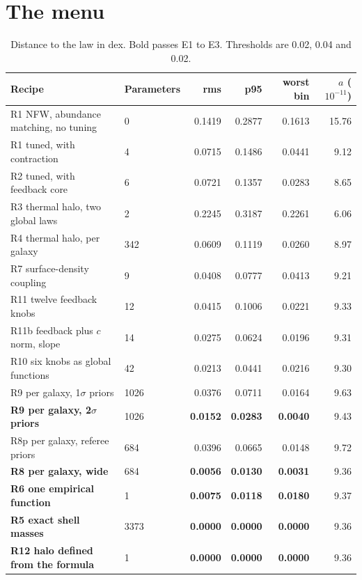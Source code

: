 \documentclass[11pt]{article}
\begin{document}
\section{The menu}
\begin{table}[h]\centering\small
\begin{tabular}{llrrrr}
\toprule
Recipe & Parameters & rms & p95 & worst bin & $a$ ($10^{-11}$)\\
\midrule
R1 NFW, abundance matching, no tuning & 0 & 0.1419 & 0.2877 & 0.1613 & 15.76\\
R1 tuned, with contraction & 4 & 0.0715 & 0.1486 & 0.0441 & 9.12\\
R2 tuned, with feedback core & 6 & 0.0721 & 0.1357 & 0.0283 & 8.65\\
R3 thermal halo, two global laws & 2 & 0.2245 & 0.3187 & 0.2261 & 6.06\\
R4 thermal halo, per galaxy & 342 & 0.0609 & 0.1119 & 0.0260 & 8.97\\
R7 surface-density coupling & 9 & 0.0408 & 0.0777 & 0.0413 & 9.21\\
R11 twelve feedback knobs & 12 & 0.0415 & 0.1006 & 0.0221 & 9.33\\
R11b feedback plus $c$ norm, slope & 14 & 0.0275 & 0.0624 & 0.0196 & 9.31\\
R10 six knobs as global functions & 42 & 0.0213 & 0.0441 & 0.0216 & 9.30\\
R9 per galaxy, 1$\sigma$ priors & 1026 & 0.0376 & 0.0711 & 0.0164 & 9.63\\
\textbf{R9 per galaxy, 2$\sigma$ priors} & 1026 & \textbf{0.0152} & \textbf{0.0283} & \textbf{0.0040} & 9.43\\
R8p per galaxy, referee priors & 684 & 0.0396 & 0.0665 & 0.0148 & 9.72\\
\textbf{R8 per galaxy, wide} & 684 & \textbf{0.0056} & \textbf{0.0130} & \textbf{0.0031} & 9.36\\
\textbf{R6 one empirical function} & 1 & \textbf{0.0075} & \textbf{0.0118} & \textbf{0.0180} & 9.37\\
\textbf{R5 exact shell masses} & 3373 & \textbf{0.0000} & \textbf{0.0000} & \textbf{0.0000} & 9.36\\
\textbf{R12 halo defined from the formula} & 1 & \textbf{0.0000} & \textbf{0.0000} & \textbf{0.0000} & 9.36\\
\bottomrule
\end{tabular}
\caption{Distance to the law in dex. Bold passes E1 to E3. Thresholds are 0.02, 0.04 and 0.02.}
\end{table}
\end{document}
